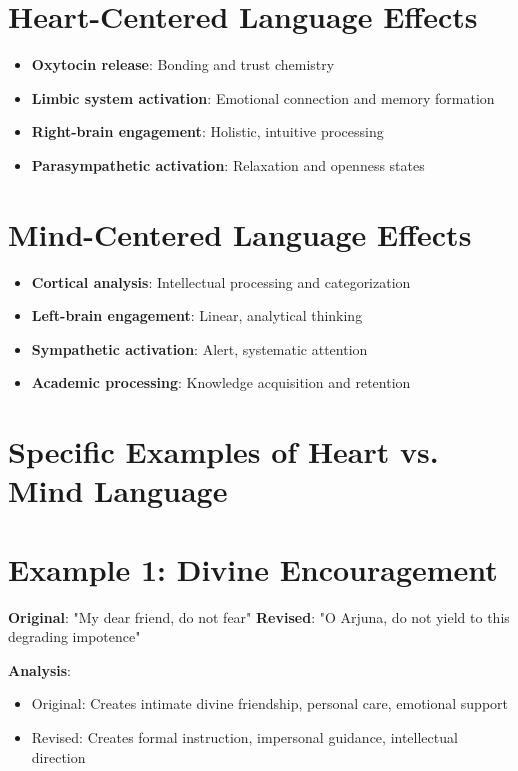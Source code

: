 \documentclass[11pt,twoside]{book}
\begin{document}
\section*{Heart-Centered Language Effects}
\label{sec:orga426a23}
\begin{itemize}
\item \textbf{\textbf{Oxytocin release}}: Bonding and trust chemistry
\item \textbf{\textbf{Limbic system activation}}: Emotional connection and memory formation
\item \textbf{\textbf{Right-brain engagement}}: Holistic, intuitive processing
\item \textbf{\textbf{Parasympathetic activation}}: Relaxation and openness states
\end{itemize}
\section*{Mind-Centered Language Effects}
\label{sec:org7b9f4b1}
\begin{itemize}
\item \textbf{\textbf{Cortical analysis}}: Intellectual processing and categorization
\item \textbf{\textbf{Left-brain engagement}}: Linear, analytical thinking
\item \textbf{\textbf{Sympathetic activation}}: Alert, systematic attention
\item \textbf{\textbf{Academic processing}}: Knowledge acquisition and retention
\end{itemize}
\section*{Specific Examples of Heart vs. Mind Language}
\label{sec:orgb35044e}

\section*{Example 1: Divine Encouragement}
\label{sec:orgf0485e3}
\textbf{\textbf{Original}}: "My dear friend, do not fear"
\textbf{\textbf{Revised}}: "O Arjuna, do not yield to this degrading impotence"

\textbf{\textbf{Analysis}}: 
\begin{itemize}
\item Original: Creates intimate divine friendship, personal care, emotional support
\item Revised: Creates formal instruction, impersonal guidance, intellectual direction
\end{itemize}
\end{document}
